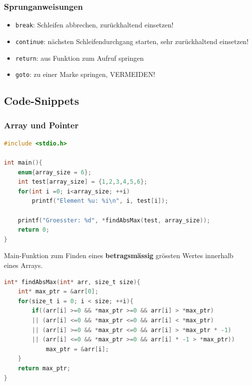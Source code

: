 		\subsubsection{Sprunganweisungen}
			\begin{itemize}
				\item \verb|break|: Schleifen abbrechen, zurückhaltend einsetzen!
				\item \verb|continue|: nächsten Schleifendurchgang starten, sehr zurückhaltend einsetzen!
				\item \verb|return|: aus Funktion zum Aufruf springen
				\item \verb|goto|: zu einer Marke springen, VERMEIDEN!
			\end{itemize}

	\subsection{Code-Snippets}
		\subsubsection{Array und Pointer}
			\begin{lstlisting}[language=C]
#include <stdio.h>

int main(){
	enum{array_size = 6};
	int test[array_size] = {1,2,3,4,5,6};
	for(int i =0; i<array_size; ++i)
		printf("Element %u: %i\n", i, test[i]);
	
	printf("Groesster: %d", *findAbsMax(test, array_size));
	return 0;
}
			\end{lstlisting}
			Main-Funktion zum Finden eines \textbf{betragsmässig} grössten Wertes innerhalb eines Arrays.

			\begin{lstlisting}[language=C]
int* findAbsMax(int* arr, size_t size){
	int* max_ptr = &arr[0];
	for(size_t i = 0; i < size; ++i){
		if((arr[i] >=0 && *max_ptr >=0 && arr[i] > *max_ptr)
		|| (arr[i] <=0 && *max_ptr <=0 && arr[i] < *max_ptr)
		|| (arr[i] >=0 && *max_ptr <=0 && arr[i] > *max_ptr * -1)
		|| (arr[i] <=0 && *max_ptr >=0 && arr[i] * -1 > *max_ptr))
			max_ptr = &arr[i];
	}
	return max_ptr;
}
			\end{lstlisting}